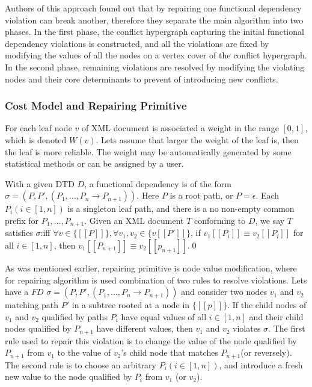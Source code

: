 Authors of this approach found out that by repairing one functional dependency violation can break another, therefore they separate the main algorithm into two phases. In the first phase, the conflict hypergraph capturing the initial functional dependency violations is constructed, and all the violations are fixed by modifying the values of all the nodes on a vertex cover of the conflict hypergraph. In the second phase, remaining violations are resolved by modifying the violating nodes and their core determinants to prevent of introducing new conflicts.

\subsubsection{Cost Model and Repairing Primitive}

For each leaf node $v$ of XML document is associated a weight in the range $[0,1]$, which is denoted $W(v)$. Lets assume that larger the weight of the leaf is, then the leaf is more reliable. The weight may be automatically generated by some statistical methods or can be assigned by a user.

\begin{define}
With a given DTD $D$, a functional dependency is of the form $\sigma = (P, P', (P_1, \dots, P_n \rightarrow P_{n+1}))$. Here $P$ is a  root path, or $P = \epsilon$. Each $P_i (i \in [1,n])$ is a singleton leaf path, and there is a no non-empty common prefix for $P_1, \dots, P_{n+1}$. Given an XML document $T$ conforming to $D$, we say $T$ satisfies $\sigma$:iff $\forall v \in \{[\![P]\!]\}, \forall v_1, v_2 \in \{v[\![P']\!]\}$, if $v_1[\![P_i]\!] \equiv v_2[\![P_i]\!]$ for all $i \in [1,n]$, then $v_1[\![P_{n+1}]\!] \equiv v_2[\![p_{n+1}]\!]$.\qed
\end{define}

As was mentioned earlier, repairing primitive is node value modification, where for repairing algorithm is used combination of two rules to resolve violations. Lets have a $FD$ $\sigma = (P, P', (P_1, \dots, P_n \rightarrow P_{n+1}))$ and consider two nodes $v_1$ and $v_2$ matching path $P'$ in a subtree rooted at a node in $\{[\![p]\!]\}$. If the child nodes of $v_1$ and $v_2$ qualified by paths $P_i$ have equal values of all $i \in [1,n]$ and their child nodes qualified by $P_{n+1}$ have different values, then $v_1$ and $v_2$ violates $\sigma$. The first rule used to repair this violation is to change the value of the node qualified by $P_{n+1}$ from $v_1$ to the value of $v_2$'s child node that matches $P_{n+1}$(or reversely). The second rule is to choose an arbitrary $P_i (i \in [1,n])$, and introduce a fresh new value to the node qualified by $P_i$ from $v_1$ (or $v_2$).

